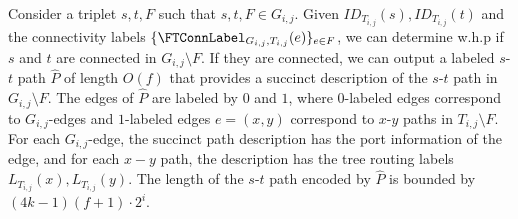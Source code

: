 \begin{lemma}\label{lem:succint_path_routing}
Consider a triplet $s,t,F$ such that $s,t,F \in G_{i,j}$. 
Given $ID_{T_{i,j}}(s),ID_{T_{i,j}}(t)$ and the connectivity labels $\{\FTConnLabel_{G_{i,j},T_{i,j}}(e)\}_{e \in F}$, we can determine w.h.p if $s$ and $t$ are connected in $G_{i,j} \setminus F$. If they are connected, we can output a labeled $s$-$t$ path $\widehat{P}$ of length $O(f)$ that provides a succinct description of the $s$-$t$ path in $G_{i,j} \setminus F$. The edges of $\widehat{P}$ are labeled by $0$ and $1$, where $0$-labeled edges correspond to $G_{i,j}$-edges and $1$-labeled edges $e=(x,y)$ correspond to $x$-$y$ paths in $T_{i,j} \setminus F$. For each $G_{i,j}$-edge, the succinct path description has the port information of the edge, and for each $x-y$ path, the description has the tree routing labels $L_{T_{i,j}}(x),L_{T_{i,j}}(y)$.
The length of the $s$-$t$ path encoded by $\widehat{P}$ is bounded by $(4k-1)(f+1)\cdot 2^i$. 
\end{lemma}


